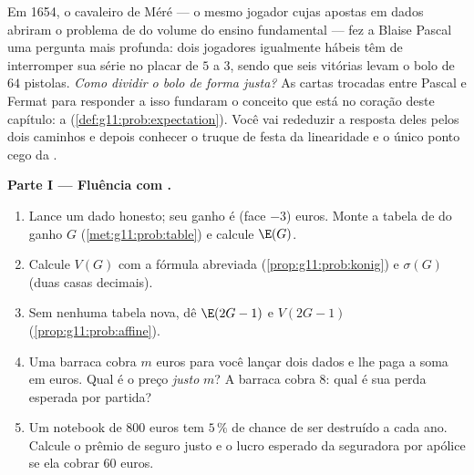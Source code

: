 \begin{problem}
\label{pb:g11:prob:1}
Em 1654, o cavaleiro de Méré --- o mesmo jogador cujas apostas em
dados abriram o problema de  do volume do ensino
fundamental --- fez a Blaise Pascal uma pergunta mais profunda:
dois jogadores igualmente hábeis têm de interromper sua série no
placar de $5$ a $3$, sendo que seis vitórias levam o bolo de $64$
pistolas. \emph{Como dividir o bolo de forma justa?} As cartas
trocadas entre Pascal e Fermat para responder a isso fundaram o
conceito que está no coração deste capítulo: a 
(\cref{def:g11:prob:expectation}). Você vai rededuzir a resposta
deles pelos dois caminhos e depois conhecer o truque de festa da
linearidade e o único ponto cego da .

\medskip
\noindent\textbf{Parte I --- Fluência com .}
\begin{enumerate}
  \item Lance um dado honesto; seu ganho é (face $- 3$) euros.
        Monte a tabela de  do ganho $G$
        (\cref{met:g11:prob:table}) e calcule $\E(G)$.
  \item Calcule $V(G)$ com a fórmula abreviada
        (\cref{prop:g11:prob:konig}) e $\sigma(G)$ (duas casas
        decimais).
  \item Sem nenhuma tabela nova, dê $\E(2G - 1)$ e $V(2G - 1)$
        (\cref{prop:g11:prob:affine}).
  \item Uma barraca cobra $m$ euros para você lançar dois dados e
        lhe paga a soma em euros. Qual é o preço \emph{justo}
        $m$? A barraca cobra $8$: qual é sua perda esperada por
        partida?
  \item Um notebook de $800$ euros tem $5\,\%$ de chance de ser
        destruído a cada ano. Calcule o prêmio de seguro justo e
        o lucro esperado da seguradora por apólice se ela cobrar
        $60$ euros.
\end{enumerate}


\end{problem}
